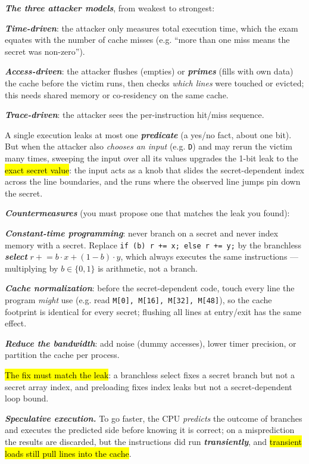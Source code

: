 \documentclass[12pt, a4paper]{article}
\newcommand{\term}[1]{\textbf{\textit{#1}}}        %
\newcommand{\imp}[1]{\hl{#1}}                       %
\begin{document}
\term{The three attacker models}, from weakest to strongest:
\begin{tightitem}
    \item \term{Time-driven}: the attacker only measures total execution time, which the exam equates with the number of cache misses (e.g. ``more than one miss means the secret was non-zero'').
    \item \term{Access-driven}: the attacker flushes (empties) or \term{primes} (fills with own data) the cache before the victim runs, then checks \emph{which lines} were touched or evicted; this needs shared memory or co-residency on the same cache.
    \item \term{Trace-driven}: the attacker sees the per-instruction hit/miss sequence.
\end{tightitem}
A single execution leaks at most one \term{predicate} (a yes/no fact, about one bit). But when the attacker also \emph{chooses an input} (e.g. \texttt{D}) and may rerun the victim many times, sweeping the input over all its values upgrades the 1-bit leak to the \imp{exact secret value}: the input acts as a knob that slides the secret-dependent index across the line boundaries, and the runs where the observed line jumps pin down the secret.

\term{Countermeasures} (you must propose one that matches the leak you found):
\begin{tightitem}
    \item \term{Constant-time programming}: never branch on a secret and never index memory with a secret. Replace \texttt{if (b) r += x; else r += y;} by the branchless \term{select} $r \mathrel{+}= b \cdot x + (1-b) \cdot y$, which always executes the same instructions --- multiplying by $b \in \{0,1\}$ is arithmetic, not a branch.
    \item \term{Cache normalization}: before the secret-dependent code, touch every line the program \emph{might} use (e.g. read \texttt{M[0], M[16], M[32], M[48]}), so the cache footprint is identical for every secret; flushing all lines at entry/exit has the same effect.
    \item \term{Reduce the bandwidth}: add noise (dummy accesses), lower timer precision, or partition the cache per process.
\end{tightitem}
\imp{The fix must match the leak}: a branchless select fixes a secret branch but not a secret array index, and preloading fixes index leaks but not a secret-dependent loop bound.

\term{Speculative execution.} To go faster, the CPU \emph{predicts} the outcome of branches and executes the predicted side before knowing it is correct; on a misprediction the results are discarded, but the instructions did run \term{transiently}, and \imp{transient loads still pull lines into the cache}.
\end{document}
